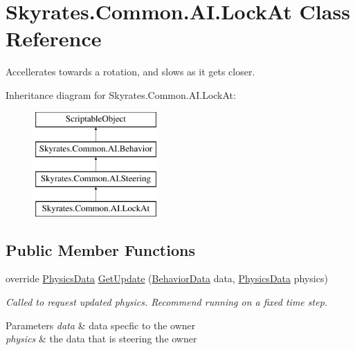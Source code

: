 \hypertarget{class_skyrates_1_1_common_1_1_a_i_1_1_lock_at}{\section{Skyrates.\-Common.\-A\-I.\-Lock\-At Class Reference}
\label{class_skyrates_1_1_common_1_1_a_i_1_1_lock_at}
}


Accellerates towards a rotation, and slows as it gets closer.  


Inheritance diagram for Skyrates.\-Common.\-A\-I.\-Lock\-At\-:\begin{figure}[H]
\begin{center}
\leavevmode
\includegraphics[height=4.000000cm]{class_skyrates_1_1_common_1_1_a_i_1_1_lock_at}
\end{center}
\end{figure}
\subsection*{Public Member Functions}
\begin{DoxyCompactItemize}
\item 
\hypertarget{class_skyrates_1_1_common_1_1_a_i_1_1_lock_at_a3f7b910caddfac363c259085cfbcf747}{override \hyperlink{class_skyrates_1_1_common_1_1_a_i_1_1_physics_data}{Physics\-Data} \hyperlink{class_skyrates_1_1_common_1_1_a_i_1_1_lock_at_a3f7b910caddfac363c259085cfbcf747}{Get\-Update} (\hyperlink{class_skyrates_1_1_common_1_1_a_i_1_1_behavior_data}{Behavior\-Data} data, \hyperlink{class_skyrates_1_1_common_1_1_a_i_1_1_physics_data}{Physics\-Data} physics)}\label{class_skyrates_1_1_common_1_1_a_i_1_1_lock_at_a3f7b910caddfac363c259085cfbcf747}

\begin{DoxyCompactList}\small\item\em Called to request updated physics. Recommend running on a fixed time step. 


\begin{DoxyParams}{Parameters}
{\em data} & data specfic to the owner\\
\hline
{\em physics} & the data that is steering the owner\\
\hline
\end{DoxyParams}
 \end{DoxyCompactList}\end{DoxyCompactItemize}
